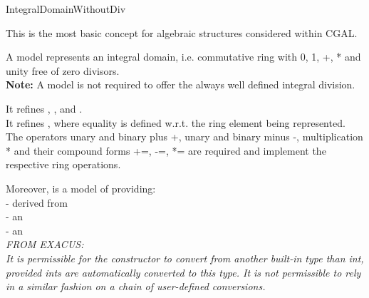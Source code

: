 \begin{ccRefConcept}{IntegralDomainWithoutDiv}


\ccDefinition

This is the most basic concept for algebraic structures considered within CGAL. 

A model   represents an integral domain,
i.e. commutative ring with 0, 1, +, * and unity free of zero divisors.\\ 
{\bf Note:} A model is not required to offer the always well defined integral division.

It refines , , 
and . \\ 
It refines , where equality is defined w.r.t. 
the ring element being represented. \\
The operators unary and binary plus +, unary and binary minus -, 
multiplication * and their compound forms +=, -=, *= are required and 
implement the respective ring operations.

Moreover,  is a model of 
 providing:\\
 
-  derived from  \\
-   an \\
-  an \\




{ \em \small FROM EXACUS: \\
It is permissible for the constructor 
to convert from another built-in type than int, provided ints are
automatically converted to this type. It is not permissible to 
rely in a similar fashion on a chain of user-defined conversions.
}



\ccRefines
{}\\
\\
\\
\\ 
\\


\end{ccRefConcept}
